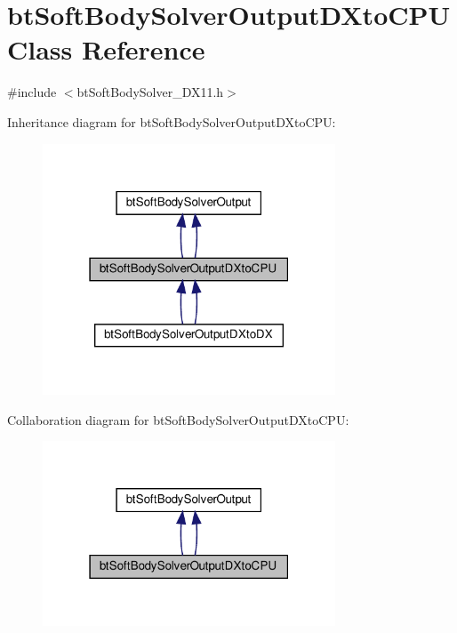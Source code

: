 \hypertarget{classbtSoftBodySolverOutputDXtoCPU}{}\section{bt\+Soft\+Body\+Solver\+Output\+D\+Xto\+C\+PU Class Reference}
\label{classbtSoftBodySolverOutputDXtoCPU}


{\ttfamily \#include $<$bt\+Soft\+Body\+Solver\+\_\+\+D\+X11.\+h$>$}



Inheritance diagram for bt\+Soft\+Body\+Solver\+Output\+D\+Xto\+C\+PU\+:
\nopagebreak
\begin{figure}[H]
\begin{center}
\leavevmode
\includegraphics[width=247pt]{classbtSoftBodySolverOutputDXtoCPU__inherit__graph}
\end{center}
\end{figure}


Collaboration diagram for bt\+Soft\+Body\+Solver\+Output\+D\+Xto\+C\+PU\+:
\nopagebreak
\begin{figure}[H]
\begin{center}
\leavevmode
\includegraphics[width=247pt]{classbtSoftBodySolverOutputDXtoCPU__coll__graph}
\end{center}
\end{figure}

